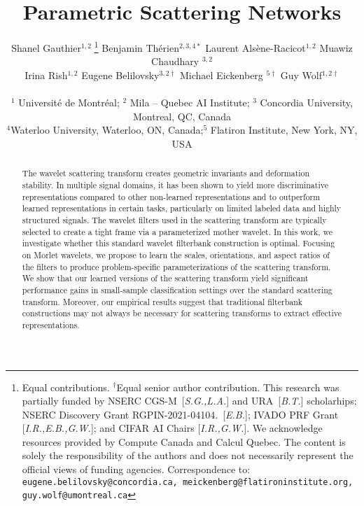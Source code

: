 \documentclass[10pt,twocolumn,letterpaper]{article}
\begin{document}
\title{Parametric Scattering Networks}



\author{\parbox{\textwidth}{\centering
    Shanel Gauthier$^{1,2}\;$\thanks{Equal contributions. $^{\dagger}$Equal senior author contribution. This research was partially funded by NSERC CGS-M~[\emph{S.G.,L.A.}] and URA~[\emph{B.T.}] scholarhips; NSERC Discovery Grant RGPIN-2021-04104.~[\emph{E.B.}]; IVADO PRF Grant [\emph{I.R.,E.B.,G.W.}]; and CIFAR AI Chairs [\emph{I.R.,G.W.}]. We acknowledge resources provided by Compute Canada and Calcul Quebec. The content is solely the responsibility of the authors and does not necessarily represent the official views of funding agencies. Correspondence to: \texttt{eugene.belilovsky@concordia.ca, meickenberg@flatironinstitute.org, guy.wolf@umontreal.ca}} \hspace{-10pt}
    \qquad Benjamin Th\'{e}rien$^{2,3,4*}$ \hspace{-10pt}
    \qquad Laurent Als\`{e}ne-Racicot$^{1,2}$ \hspace{-10pt}
    \qquad Muawiz Chaudhary $^{3,2}$\\
    Irina Rish$^{1,2}$
    \qquad Eugene Belilovsky$^{3,2 \dagger}$
    \qquad Michael Eickenberg $^{5 \dagger}$
    \qquad Guy Wolf$^{1,2 \dagger}$} \vspace{5pt}\\
$^1$ Universit\'{e} de Montr\'{e}al; $^2$ Mila -- Quebec AI Institute; $^3$ Concordia University, Montreal, QC, Canada \\
$^4$Waterloo University, Waterloo, ON, Canada;$^5$ Flatiron Institute, New York, NY, USA\\ 
}



\maketitle
\begin{abstract}\vspace{-4pt}
   The wavelet scattering transform creates geometric invariants and deformation stability. In multiple signal domains, it has been shown to yield more discriminative representations compared to other non-learned representations and to outperform learned representations in certain tasks, particularly on limited labeled data and highly structured signals. The wavelet filters used in the scattering transform are typically selected to create a tight frame via a parameterized mother wavelet. In this work, we investigate whether this standard wavelet filterbank construction is optimal. Focusing on Morlet wavelets, we propose to learn the scales, orientations, and aspect ratios of the filters to produce problem-specific parameterizations of the scattering transform. We show that our learned versions of the scattering transform yield significant performance gains in small-sample classification settings over the standard scattering transform. Moreover, our empirical results suggest that traditional filterbank constructions may not always be necessary for scattering transforms to extract effective representations.
\end{abstract}
\vspace{-12pt}
\end{document}
